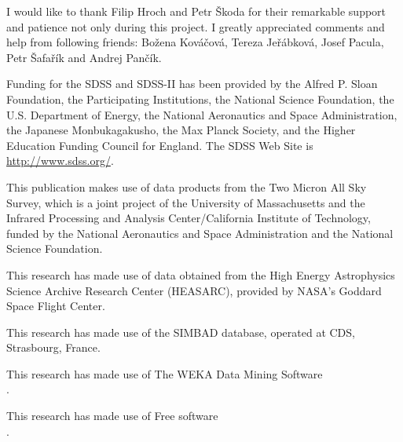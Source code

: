 

\begin{acknowledgements}      %


  I would like to thank Filip Hroch and Petr \v{S}koda for their
  remarkable support and patience not only during this project. I
  greatly appreciated comments and help from following friends:
  Bo\v{z}ena Kov\'{a}\v{c}ov\'{a}, Tereza Je\v{r}\'{a}bkov\'{a}, Josef
  Pacula, Petr \v{S}afa\v{r}\'{i}k and Andrej Pan\v{c}\'{i}k.

  \bigskip 
  Funding for the SDSS and SDSS-II has been provided by the
  Alfred P. Sloan Foundation, the Participating Institutions, the
  National Science Foundation, the U.S. Department of Energy, the
  National Aeronautics and Space Administration, the Japanese
  Monbukagakusho, the Max Planck Society, and the Higher Education
  Funding Council for England. The SDSS Web Site is
  \url{http://www.sdss.org/}.

  \bigskip

  This publication makes use of data products from the Two Micron All
  Sky Survey, which is a joint project of the University of
  Massachusetts and the Infrared Processing and Analysis
  Center/California Institute of Technology, funded by the National
  Aeronautics and Space Administration and the National Science
  Foundation.

  \bigskip 
  
  This research has made use of data obtained from the High
  Energy Astrophysics Science Archive Research Center (HEASARC),
  provided by NASA's Goddard Space Flight Center.

  \bigskip

  This research has made use of the SIMBAD database, operated at CDS,
  Strasbourg, France.

  \bigskip

  This research has made use of The WEKA Data Mining Software
  \\ \citep{hall2009weka}.

  \bigskip

  This research has made use of Free software \\ \citep{GPL}.




\end{acknowledgements}


